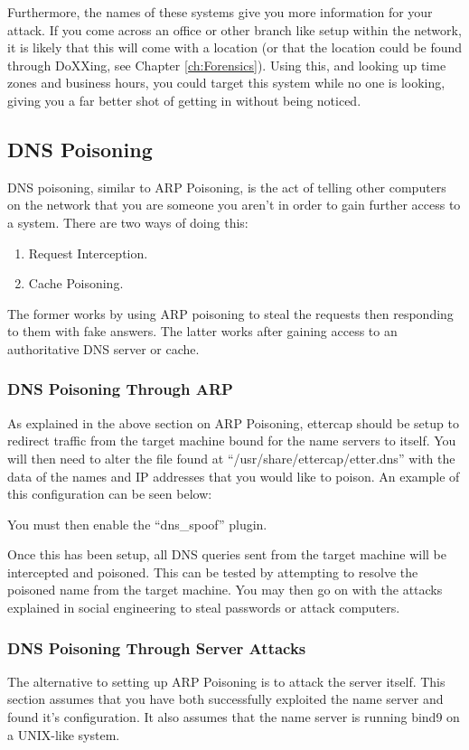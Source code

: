 				Furthermore, the names of these systems give you more information for your attack. 
				If you come across an office or other branch like setup within the network, it is likely that this will come with a location (or that the location could be found through DoXXing, see Chapter \ref{ch:Forensics}). 
				Using this, and looking up time zones and business hours, you could target this system while no one is looking, 
				giving you a far better shot of getting in without being noticed. 

		\subsection{DNS Poisoning}
			DNS poisoning, similar to ARP Poisoning, is the act of telling other computers on the network that you are someone you aren't in order to gain further access to a system. 
			There are two ways of doing this:
			\begin{enumerate}
				\item Request Interception.
				\item Cache Poisoning. 
			\end{enumerate}
			The former works by using ARP poisoning to steal the requests then responding to them with fake answers. 
			The latter works after gaining access to an authoritative DNS server or cache. 

			\subsubsection{DNS Poisoning Through ARP}
				As explained in the above section on ARP Poisoning, ettercap should be setup to redirect traffic from the target machine bound for the name servers to itself. 
				You will then need to alter the file found at ``/usr/share/ettercap/etter.dns'' with the data of the names and IP addresses that you would like to poison. 
				An example of this configuration can be seen below:
				
				You must then enable the ``dns\_spoof'' plugin. 

				Once this has been setup, all DNS queries sent from the target machine will be intercepted and poisoned. 
				This can be tested by attempting to resolve the poisoned name from the target machine. 
				You may then go on with the attacks explained in social engineering to steal passwords or attack computers. 
			\subsubsection{DNS Poisoning Through Server Attacks}
				The alternative to setting up ARP Poisoning is to attack the server itself. 
				This section assumes that you have both successfully exploited the name server and found it's configuration. 
				It also assumes that the name server is running bind9 on a UNIX-like system. 

